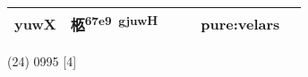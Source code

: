 \documentclass[14pt,a4paper]{scrartcl}
\begin{document}
\begin{longtable}[c]{@{}llllll@{}}
\begin{minipage}[t]{0.14\columnwidth}
yuwX
\strut\end{minipage} &
\begin{minipage}[t]{0.14\columnwidth}\raggedright\strut
柩\textsuperscript{67e9~gjuwH}
\strut\end{minipage} &
\begin{minipage}[t]{0.14\columnwidth}\raggedright\strut
\strut\end{minipage} &
\begin{minipage}[t]{0.14\columnwidth}\raggedright\strut
\strut\end{minipage} &
\begin{minipage}[t]{0.14\columnwidth}\raggedright\strut
pure:velars
\strut\end{minipage}\tabularnewline
\bottomrule
\end{longtable}

(24) 0995 {[}4{]}
\end{document}
